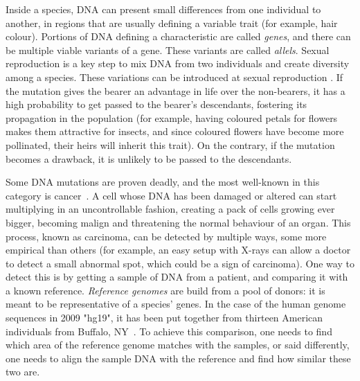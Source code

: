 Inside a species, DNA can present small differences from one individual to another, in regions that are usually defining a variable trait (for example, hair colour). Portions of DNA defining a characteristic are called \emph{genes}, and there can be multiple viable variants of a gene. These variants are called \emph{allels}. Sexual reproduction is a key step to mix DNA from two individuals and create diversity among a species. These variations can be introduced at sexual reproduction . If the mutation gives the bearer an advantage in life over the non-bearers, it has a high probability to get passed to the bearer's descendants, fostering its propagation in the population (for example, having coloured petals for flowers makes them attractive for insects, and since coloured flowers have become more pollinated, their heirs will inherit this trait). On the contrary, if the mutation becomes a drawback, it is unlikely to be passed to the descendants.

Some DNA mutations are proven deadly, and the most well-known in this category is cancer~\cite{misc:diseases}. A cell whose DNA has been damaged or altered can start multiplying in an uncontrollable fashion, creating a pack of cells growing ever bigger, becoming malign and threatening the normal behaviour of an organ. This process, known as carcinoma, can be detected by multiple ways, some more empirical than others (for example, an easy setup with X-rays can allow a doctor to detect a small abnormal spot, which could be a sign of carcinoma). One way to detect this is by getting a sample of DNA from a patient, and comparing it with a known reference. \emph{Reference genomes} are build from a pool of donors: it is meant to be representative of a species' genes. In the case of the human genome sequences in 2009 "hg19", it has been put together from thirteen American individuals from Buffalo, NY~\cite{referencegenome}.
To achieve this comparison, one needs to find which area of the reference genome matches with the samples, or said differently, one needs to align the sample DNA with the reference and find how similar these two are.



